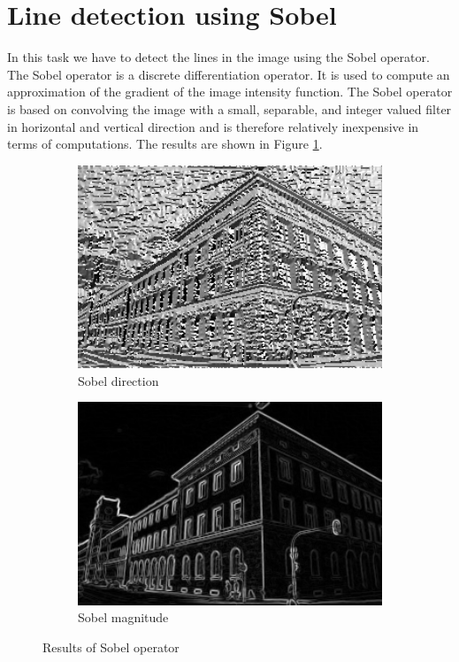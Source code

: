 \documentclass[12pt
,headinclude
,headsepline
,bibtotocnumbered
]{scrartcl}
\begin{document}
\section*{Line detection using Sobel}
In this task we have to detect the lines in the image using the Sobel operator. The Sobel operator is a discrete differentiation operator. It is used to compute an approximation of the gradient of the image intensity function. The Sobel operator is based on convolving the image with a small, separable, and integer valued filter in horizontal and vertical direction and is therefore relatively inexpensive in terms of computations. The results are shown in Figure \ref{fig:3}.
\begin{figure}[H]
    \centering
    \begin{subfigure}{0.45\textwidth}
        \includegraphics[width=1.25\textwidth]{plots/sobel_dir.png}
        \caption*{Sobel direction}
    \end{subfigure}
    \hfill
    \begin{subfigure}{0.45\textwidth}
        \includegraphics[width=1.25\textwidth]{plots/sobel_mag.png}
        \caption*{Sobel magnitude}
    \end{subfigure}
    \caption{Results of Sobel operator}
    \label{fig:3}
\end{figure}
\end{document}

